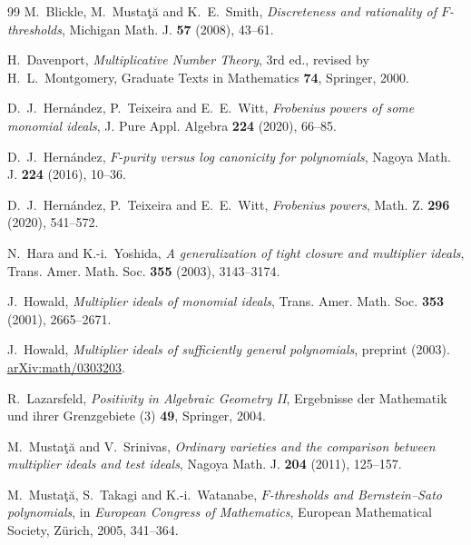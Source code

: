 \documentclass[11pt]{amsart}
\numberwithin{equation}{section}
\theoremstyle{definition}
\begin{document}
\begin{thebibliography}{99}
M.~Blickle, M.~Musta\c{t}\u{a} and K.~E.~Smith,
\emph{Discreteness and rationality of $F$-thresholds},
Michigan Math. J. \textbf{57} (2008), 43--61.

H.~Davenport, \emph{Multiplicative Number Theory},
3rd ed., revised by H.~L.~Montgomery,
Graduate Texts in Mathematics \textbf{74}, Springer, 2000.

D.~J.~Hern\'andez, P.~Teixeira and E.~E.~Witt,
\emph{Frobenius powers of some monomial ideals},
J. Pure Appl. Algebra \textbf{224} (2020), 66--85.

D.~J.~Hern\'andez, \emph{$F$-purity versus log canonicity for polynomials},
Nagoya Math. J. \textbf{224} (2016), 10--36.

D.~J.~Hern\'andez, P.~Teixeira and E.~E.~Witt,
\emph{Frobenius powers}, Math. Z. \textbf{296} (2020), 541--572.

N.~Hara and K.-i.~Yoshida,
\emph{A generalization of tight closure and multiplier ideals},
Trans. Amer. Math. Soc. \textbf{355} (2003), 3143--3174.

J.~Howald, \emph{Multiplier ideals of monomial ideals},
Trans. Amer. Math. Soc. \textbf{353} (2001), 2665--2671.

J.~Howald, \emph{Multiplier ideals of sufficiently general polynomials},
preprint (2003).
\href{https://arxiv.org/abs/math/0303203}{arXiv:math/0303203}.

R.~Lazarsfeld, \emph{Positivity in Algebraic Geometry II},
Ergebnisse der Mathematik und ihrer Grenzgebiete (3) \textbf{49},
Springer, 2004.

M.~Musta\c{t}\u{a} and V.~Srinivas,
\emph{Ordinary varieties and the comparison between multiplier ideals and test ideals},
Nagoya Math. J. \textbf{204} (2011), 125--157.

M.~Musta\c{t}\u{a}, S.~Takagi and K.-i.~Watanabe,
\emph{$F$-thresholds and Bernstein--Sato polynomials},
in \emph{European Congress of Mathematics},
European Mathematical Society, Z\"urich, 2005, 341--364.
\end{thebibliography}
\end{document}
